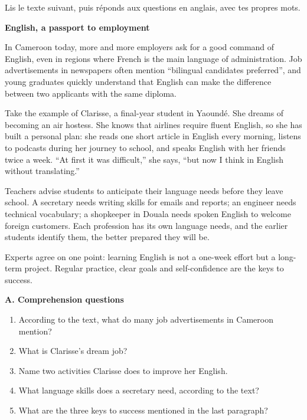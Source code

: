 \documentclass[11pt]{article}
\begin{document}
\begin{exercice}
Lis le texte suivant, puis réponds aux questions en anglais, avec tes propres mots.

\medskip
\noindent
\textbf{English, a passport to employment}\par
In Cameroon today, more and more employers ask for a good command of English, even in regions where French is the main language of administration. Job advertisements in newspapers often mention “bilingual candidates preferred”, and young graduates quickly understand that English can make the difference between two applicants with the same diploma.

Take the example of Clarisse, a final-year student in Yaoundé. She dreams of becoming an air hostess. She knows that airlines require fluent English, so she has built a personal plan: she reads one short article in English every morning, listens to podcasts during her journey to school, and speaks English with her friends twice a week. “At first it was difficult,” she says, “but now I think in English without translating.”

Teachers advise students to anticipate their language needs before they leave school. A secretary needs writing skills for emails and reports; an engineer needs technical vocabulary; a shopkeeper in Douala needs spoken English to welcome foreign customers. Each profession has its own language needs, and the earlier students identify them, the better prepared they will be.

Experts agree on one point: learning English is not a one-week effort but a long-term project. Regular practice, clear goals and self-confidence are the keys to success.
\medskip

\textbf{A. Comprehension questions}
\begin{enumerate}
\item According to the text, what do many job advertisements in Cameroon mention?
\item What is Clarisse's dream job?
\item Name two activities Clarisse does to improve her English.
\item What language skills does a secretary need, according to the text?
\item What are the three keys to success mentioned in the last paragraph?
\end{enumerate}


\end{exercice}
\end{document}
